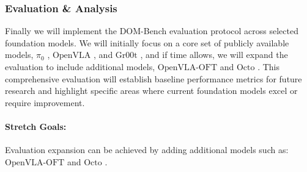 \subsubsection{Evaluation \& Analysis}
Finally we will implement the DOM-Bench evaluation protocol across selected foundation models.
We will initially focus on a core set of publicly available models, $\pi_0$ \cite{pi_zero}, $\text{OpenVLA}$ \cite{OpenVLA}, and $\text{Gr00t}$ \cite{Gr00tN1}, and if time allows, we will expand the evaluation to include additional models, $\text{OpenVLA-OFT}$ \cite{OpenVLA-OFT} and $\text{Octo}$ \cite{Octo}.
This comprehensive evaluation will establish baseline performance metrics for future research and
highlight specific areas where current foundation models excel or require improvement.

\paragraph{Stretch Goals:}

Evaluation expansion can be achieved by adding additional models such as: $\text{OpenVLA-OFT}$ \cite{OpenVLA-OFT} and $\text{Octo}$ \cite{Octo}.

